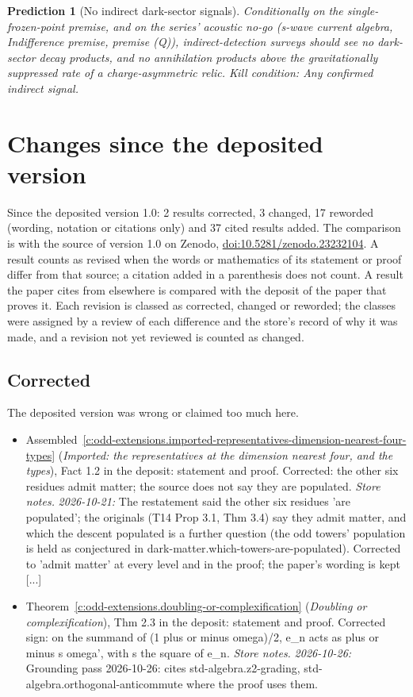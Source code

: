 \documentclass[11pt]{article}
\newtheorem{prediction}[theorem]{Prediction}
\theoremstyle{definition}
\theoremstyle{plain}
\begin{document}
\begin{prediction}[No indirect dark-sector signals]\label{c:pred.no-indirect-dark-signals}
Conditionally on the single-frozen-point premise, and on the series' acoustic no-go (s-wave current algebra, Indifference premise, premise (Q)), indirect-detection surveys should see no dark-sector decay products, and no annihilation products above the gravitationally suppressed rate of a charge-asymmetric relic.
\emph{Kill condition:} Any confirmed indirect signal.
\end{prediction}

\section*{Changes since the deposited version}
Since the deposited version 1.0: 2 results corrected, 3 changed, 17 reworded (wording, notation or citations only) and 37 cited results added. The comparison is with the source of version 1.0 on Zenodo, \href{https://doi.org/10.5281/zenodo.23232104}{doi:10.5281/zenodo.23232104}. A result counts as revised when the words or mathematics of its statement or proof differ from that source; a citation added in a parenthesis does not count. A result the paper cites from elsewhere is compared with the deposit of the paper that proves it. Each revision is classed as corrected, changed or reworded; the classes were assigned by a review of each difference and the store's record of why it was made, and a revision not yet reviewed is counted as changed.
\subsection*{Corrected}
The deposited version was wrong or claimed too much here.
\begin{itemize}\setlength{\itemsep}{2pt}
\item Assembled~\ref{c:odd-extensions.imported-representatives-dimension-nearest-four-types} (\emph{Imported: the representatives at the dimension nearest four, and the types}), Fact 1.2 in the deposit: statement and proof. Corrected: the other six residues admit matter; the source does not say they are populated. \emph{Store notes.} \emph{2026-10-21:} The restatement said the other six residues 'are populated'; the originals (T14 Prop 3.1, Thm 3.4) say they admit matter, and which the descent populated is a further question (the odd towers' population is held as conjectured in dark-matter.which-towers-are-populated). Corrected to 'admit matter' at every level and in the proof; the paper's wording is kept [...]
\item Theorem~\ref{c:odd-extensions.doubling-or-complexification} (\emph{Doubling or complexification}), Thm 2.3 in the deposit: statement and proof. Corrected sign: on the summand of (1 plus or minus omega)/2, e\_n acts as plus or minus s omega', with s the square of e\_n. \emph{Store notes.} \emph{2026-10-26:} Grounding pass 2026-10-26: cites std-algebra.z2-grading, std-algebra.orthogonal-anticommute where the proof uses them.
\end{itemize}
\end{document}

